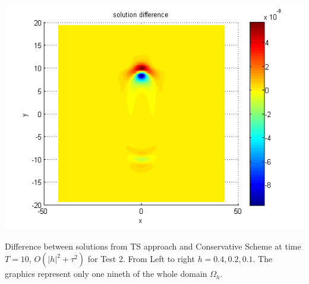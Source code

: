 \documentclass{beamer}
\begin{document}
\begin{frame}
\begin{center}
\begin{minipage}[b]{0.32\linewidth}
		\includegraphics[width=\linewidth]{figures/compare_128_bt1_c09_h010.png}		 
	\end{minipage}
\end{center}
Difference between solutions from TS approach and Conservative Scheme at time $T=10$, $O(|h|^2 + \tau^2)$ for Test 2. From Left to right $h=0.4, 0.2, 0.1$. The graphics represent only one nineth of the whole domain $\Omega_h$.
\end{frame}

\end{document}
